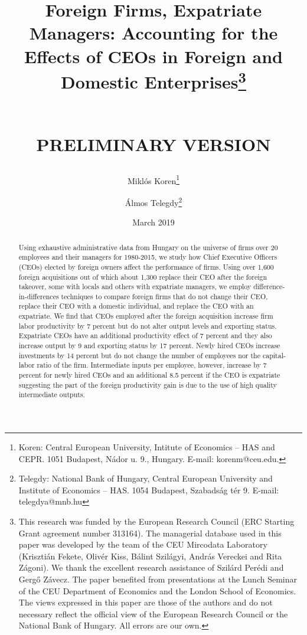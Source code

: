 \documentclass[12pt,a4paper]{article}
\begin{document}
\title{Foreign Firms, Expatriate Managers: Accounting for the Effects of CEOs in Foreign and Domestic Enterprises\thanks{This research was funded by the European Research Council (ERC Starting Grant agreement number 313164). The managerial database used in this paper was developed by the team of the CEU Mircodata Laboratory (Krisztián Fekete, Olivér Kiss, Bálint Szilágyi, András Vereckei and Rita Zágoni). We thank the excellent research assistance of Szilárd Perédi and Gergő Závecz. The paper benefited from presentations at the Lunch Seminar of the CEU Department of Economics and the London School of Economics. The views expressed in this paper are those of the authors and do not necessary reflect the official view of the European Research Council or the National Bank of Hungary. All errors are our own.}

\newline\\\small{PRELIMINARY VERSION}}

\author{Miklós Koren\thanks{Koren: Central European University, Intitute of Economics -- HAS and CEPR. 1051 Budapest, Nádor u. 9., Hungary. E-mail: korenm@ceu.edu.} \and Álmos Telegdy\thanks{Telegdy: National Bank of Hungary, Central European University and Institute of Economics -- HAS. 1054 Budapest, Szabadság tér 9. E-mail: telegdya@mnb.hu}}

\date{March 2019}
\maketitle

\begin{abstract}
Using exhaustive administrative data from Hungary on the universe of firms over 20 employees and their managers for 1980-2015, we study how Chief Executive Officers (CEOs) elected by foreign owners affect the performance of firms. Using over 1,600 foreign acquisitions out of which about 1,300 replace their CEO after the foreign takeover, some with locals and others with expatriate managers, we employ difference-in-differences techniques to compare foreign firms that do not change their CEO, replace their CEO with a domestic individual, and replace the CEO with an expatriate. We find that CEOs employed after the foreign acquisition increase firm labor productivity by 7 percent but do not alter output levels and exporting status. Expatriate CEOs have an additional productivity effect of 7 percent and they also increase output by 9 and exporting status by 17 percent. Newly hired CEOs increase investments by 14 percent but do not change the number of employees nor the capital-labor ratio of the firm. Intermediate inputs per employee, however, increase by 7 percent for newly hired CEOs and an additional 8.5 percent if the CEO is expatriate suggesting the part of the foreign productivity gain is due to the use of high quality intermediate outputs. 
\end{abstract}
\end{document}
